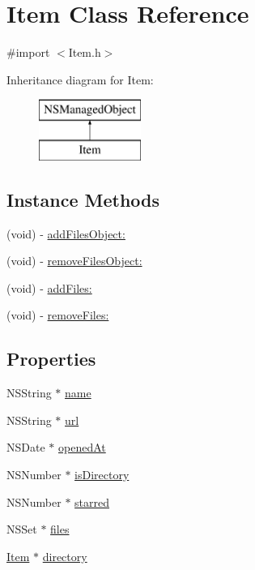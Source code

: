 \hypertarget{interface_item}{\section{Item Class Reference}
\label{interface_item}
}


{\ttfamily \#import $<$Item.\-h$>$}

Inheritance diagram for Item\-:\begin{figure}[H]
\begin{center}
\leavevmode
\includegraphics[height=2.000000cm]{interface_item}
\end{center}
\end{figure}
\subsection*{Instance Methods}
\begin{DoxyCompactItemize}
\item 
(void) -\/ \hyperlink{interface_item_ad6264e9d100d3399501f707d90e38790}{add\-Files\-Object\-:}
\item 
(void) -\/ \hyperlink{interface_item_a65de6c233583e2427fdf1a8e0fb3f449}{remove\-Files\-Object\-:}
\item 
(void) -\/ \hyperlink{interface_item_a2fa726c1c71dd76da26b02a46f3c3480}{add\-Files\-:}
\item 
(void) -\/ \hyperlink{interface_item_a572b2a483aef36ccfbe4d81f92c9d7b2}{remove\-Files\-:}
\end{DoxyCompactItemize}
\subsection*{Properties}
\begin{DoxyCompactItemize}
\item 
N\-S\-String $\ast$ \hyperlink{interface_item_ad22f53e2d75adea1b791a10adb2899b1}{name}
\item 
N\-S\-String $\ast$ \hyperlink{interface_item_afae08fe83da83ab2df5aabe74b8c4180}{url}
\item 
N\-S\-Date $\ast$ \hyperlink{interface_item_abe98dc79b3ed79107a278f5bf6457a94}{opened\-At}
\item 
N\-S\-Number $\ast$ \hyperlink{interface_item_a00c1a5ceb8509e853b894751e0a94257}{is\-Directory}
\item 
N\-S\-Number $\ast$ \hyperlink{interface_item_a51542772ade5b09d3bf610ac1d08e50f}{starred}
\item 
N\-S\-Set $\ast$ \hyperlink{interface_item_ae93ce9526874bc715122c6f15e6d2802}{files}
\item 
\hyperlink{interface_item}{Item} $\ast$ \hyperlink{interface_item_aae8a83f0b561409b81be1684f61ed72e}{directory}
\end{DoxyCompactItemize}


